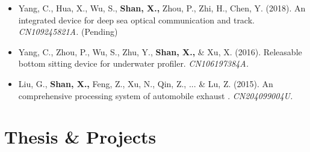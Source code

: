 \documentclass[11pt,a4paper,sans]{moderncv}         %
\begin{document}
\begin{itemize}

	\item{Yang, C., Hua, X., Wu, S., \textbf{Shan, X.,} Zhou, P., Zhi, H., Chen, Y. (2018). An integrated device for deep sea optical communication and track. \textit{CN109245821A.} (Pending)}

	      \vspace{3pt}

	\item{Yang, C., Zhou, P., Wu, S., Zhu, Y., \textbf{Shan, X.,} \& Xu, X. (2016). Releasable bottom sitting device for underwater profiler. \textit{CN106197384A.}}

	      \vspace{3pt}

	\item{Liu, G., \textbf{Shan, X.,} Feng, Z., Xu, N., Qin, Z., ... \& Lu, Z. (2015). An comprehensive processing system of automobile exhaust . \textit{CN204099004U.}}

	      \vspace{3pt}

\end{itemize}






\section{Thesis \& Projects}
\end{document}
